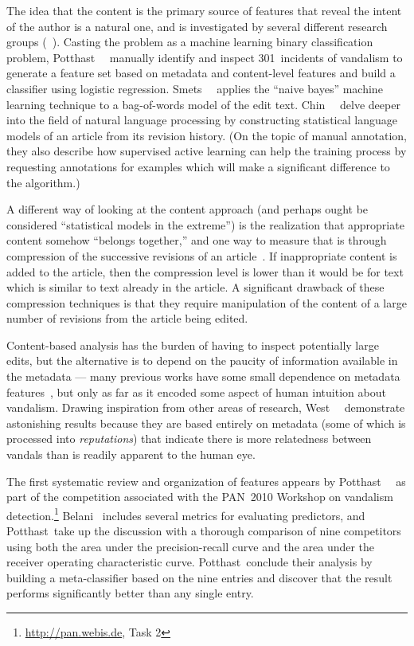 The idea that the content is the primary source of features that
reveal the intent of the author is a natural one, and is investigated
by several different research groups
(\eg~\cite{Potthast2008,Smets2008,Druck2008,Itakura2009,Chin2010}).
Casting the problem as a machine learning binary classification
problem, Potthast~\etal~\cite{Potthast2008} manually identify and
inspect 301~incidents of vandalism to generate a feature set based on
metadata and content-level features and build a classifier using
logistic regression.
Smets~\etal~\cite{Smets2008} applies the ``naive bayes'' machine
learning technique to a bag-of-words model of the edit text.
Chin~\etal~\cite{Chin2010} delve deeper into the field of
natural language processing by constructing statistical language
models of an article from its revision history.
(On the topic of manual annotation, they also describe how supervised
active learning can help the training process by requesting
annotations for examples which will make a significant difference to
the algorithm.)

A different way of looking at the content approach (and perhaps ought
be considered ``statistical models in the extreme'') is the
realization that appropriate content somehow ``belongs together,'' and
one way to measure that is through compression of the successive
revisions of an article~\cite{Smets2008,Itakura2009}.
If inappropriate content is added to the article, then the compression
level is lower than it would be for text which is similar to text
already in the article.
A significant drawback of these compression techniques is that they
require manipulation of the content of a large number of revisions
from the article being edited.

Content-based analysis has the burden of having to
inspect potentially large edits, but the alternative is to depend
on the paucity of information available in the metadata ---
many previous works have some small dependence on metadata
features~\cite{Potthast2008,Druck2008,Belani2010}, but only
as far as it encoded some aspect of human intuition about vandalism.
Drawing inspiration from other areas of research,
West~\etal~\cite{West2010} demonstrate astonishing results because
they are based entirely on metadata (some of which is processed into
\textit{reputations}) that indicate there is more relatedness between
vandals than is readily apparent to the human eye.

The first systematic review and organization of features appears
by Potthast~\etal~\cite{Potthast2010b} as part of the competition
associated with the PAN~2010 Workshop on vandalism
detection.\footnote{\url{http://pan.webis.de}, Task 2}
Belani~\cite{Belani2010} includes several metrics for evaluating
predictors, and Potthast~\etal take up the discussion with a thorough
comparison of nine competitors using both the area under the
precision-recall curve and the area under the receiver operating
characteristic curve.
Potthast~\etal conclude their analysis by building a meta-classifier
based on the nine entries and discover that the result performs
significantly better than any single entry.

